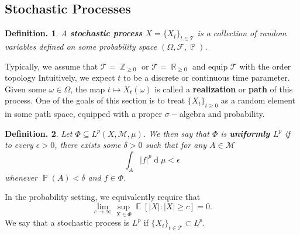 \documentclass[11pt, a4paper]{memoir}
\DeclareMathOperator{\Z}{{\mathbb{Z}}}
\DeclareMathOperator{\R}{{\mathbb{R}}}
\theoremstyle{change}
\theoremstyle{plain}
\theoremstyle{nonumberplain}
\newtheorem{definition}{Definition.}
\DeclareMathOperator{\pr}{{\mathbb{P}}}
\DeclareMathOperator{\E}{{\mathbb{E}}}
\renewcommand{\d}[1]{\ensuremath{\operatorname{d}\!{#1}}}
\newcommand{\defn}[1]{{\boldmath\bfseries #1}}
\numberwithin{equation}{section}
\begin{document}
\subsection{Stochastic Processes}
\begin{definition}
    A \defn{stochastic process} $X=\{X_t\}_{t\in \mathcal{T}}$ is a collection of random variables defined on some probability space $(\Omega,\mathcal{F},\pr)$.
\end{definition}
Typically, we assume that $\mathcal{T}=\Z_{\geq 0}$ or $\mathcal{T}=\R_{\geq 0}$ and equip $\mathcal{T}$ with the order topology
Intuitively, we expect $t$ to be a discrete or continuous time parameter.
Given some $\omega\in\Omega$, the map $t\mapsto X_t(\omega)$ is called a \defn{realization} or \defn{path} of this process.
One of the goals of this section is to treat $\{X_t\}_{t\geq 0}$ as a random element in some path space, equipped with a proper $\sigma-$algebra and probability.

\begin{definition}
    Let $\Phi\subseteq L^p(X,\mathcal{M},\mu)$.
    We then say that $\Phi$ is \defn{uniformly $L^p$} if to every $\epsilon>0$, there exists some $\delta>0$ such that for any $A\in\mathcal{M}$
    \begin{equation*}
        \int_A|f|^p\d{\mu}<\epsilon
    \end{equation*}
    whenever $\pr(A)<\delta$ and $f\in \Phi$.
\end{definition}
In the probability setting, we equivalently require that
\begin{equation*}
    \lim_{c\to\infty}\sup_{X\in\Phi}\E[|X| : |X|\geq c]=0.
\end{equation*}
We say that a stochastic process is \defn{$L^p$} if $\{X_t\}_{t\in\mathcal{T}}\subset L^p$.
\end{document}

